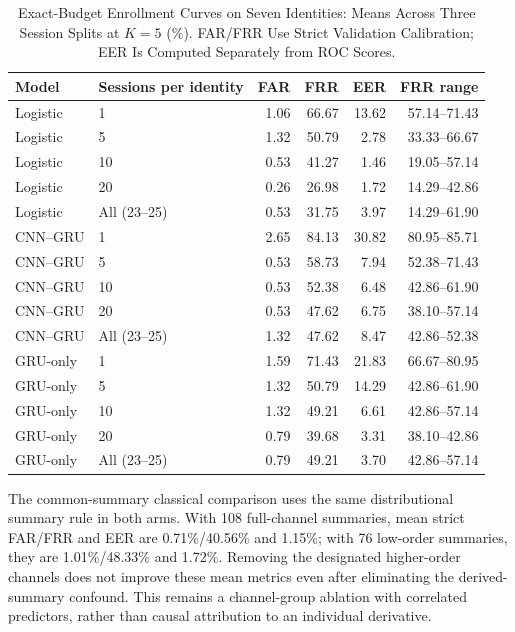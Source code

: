 \documentclass[conference]{IEEEtran}
\begin{document}
\begin{table}[t]
\centering
\caption{Exact-Budget Enrollment Curves on Seven Identities: Means Across
Three Session Splits at $K=5$ (\%). FAR/FRR Use Strict Validation Calibration;
EER Is Computed Separately from ROC Scores.}
\label{tab:enrollment_curve}
\begin{tabular}{llrrrr}
\toprule
Model & Sessions per identity & FAR & FRR & EER & FRR range \\
\midrule
Logistic & 1 & 1.06 & 66.67 & 13.62 & 57.14--71.43 \\
Logistic & 5 & 1.32 & 50.79 & 2.78 & 33.33--66.67 \\
Logistic & 10 & 0.53 & 41.27 & 1.46 & 19.05--57.14 \\
Logistic & 20 & 0.26 & 26.98 & 1.72 & 14.29--42.86 \\
Logistic & All (23--25) & 0.53 & 31.75 & 3.97 & 14.29--61.90 \\
\midrule
CNN--GRU & 1 & 2.65 & 84.13 & 30.82 & 80.95--85.71 \\
CNN--GRU & 5 & 0.53 & 58.73 & 7.94 & 52.38--71.43 \\
CNN--GRU & 10 & 0.53 & 52.38 & 6.48 & 42.86--61.90 \\
CNN--GRU & 20 & 0.53 & 47.62 & 6.75 & 38.10--57.14 \\
CNN--GRU & All (23--25) & 1.32 & 47.62 & 8.47 & 42.86--52.38 \\
\midrule
GRU-only & 1 & 1.59 & 71.43 & 21.83 & 66.67--80.95 \\
GRU-only & 5 & 1.32 & 50.79 & 14.29 & 42.86--61.90 \\
GRU-only & 10 & 1.32 & 49.21 & 6.61 & 42.86--57.14 \\
GRU-only & 20 & 0.79 & 39.68 & 3.31 & 38.10--42.86 \\
GRU-only & All (23--25) & 0.79 & 49.21 & 3.70 & 42.86--57.14 \\
\bottomrule
\end{tabular}
\end{table}

The common-summary classical comparison uses the same distributional summary rule
in both arms. With 108 full-channel summaries, mean strict FAR/FRR and EER are
0.71\%/40.56\% and 1.15\%; with 76 low-order summaries, they are
1.01\%/48.33\% and 1.72\%. Removing the designated higher-order channels does
not improve these mean metrics even after eliminating the derived-summary
confound. This remains a channel-group ablation with correlated predictors,
rather than causal attribution to an individual derivative.
\end{document}
